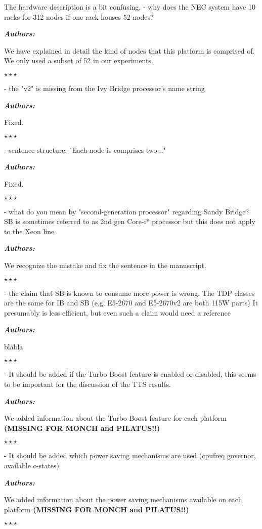 \documentclass[a4paper,11pt]{article}
\newcounter{question}
\newcommand{\weReply}{\vspace{0.25cm} {\bf \noindent } \addtocounter{question}{1} \textbf{\emph{Authors:}} \medskip \em\par}
\newenvironment{weSay}{\bigskip \weReply \begin{it}}{\end{it}\begin{center} \samepage$\star \star \star$ \end{center}}
\begin{document}
The hardware description is a bit confusing.
- why does the NEC system have 10 racks for 312 nodes if one rack houses 52
     nodes?

\begin{weSay}
We have explained in detail the kind of nodes that this platform is comprised of.
We only used a subset of 52 in our experiments.
\end{weSay}

- the "v2" is missing from the Ivy Bridge processor's name string

\begin{weSay}
Fixed.
\end{weSay}

- sentence structure: "Each node is comprises two..."

\begin{weSay}
Fixed.
\end{weSay}

- what do you mean by "second-generation processor" regarding Sandy Bridge?
     SB is sometimes referred to as 2nd gen Core-i* processor but this does not
     apply to the Xeon line

\begin{weSay}
We recognize the mistake and fix the sentence in the manuscript.
\end{weSay}

- the claim that SB is known to consume more power is wrong. The TDP classes
     are the same for IB and SB (e.g. E5-2670 and E5-2670v2 are both 115W parts)
     It presumably is less efficient, but even such a claim would need a reference

\begin{weSay}
blabla
\end{weSay}

- It should be added if the Turbo Boost feature is enabled or disabled, this
     seems to be important for the discussion of the TTS results.

\begin{weSay}
We added information about the Turbo Boost feature for each platform \textbf{(MISSING FOR MONCH and PILATUS!!)}
\end{weSay}

- It should be added which power saving mechanisms are used (cpufreq
     governor, available c-states)

\begin{weSay}
We added information about the power saving mechanisms available on each platform \textbf{(MISSING FOR MONCH and PILATUS!!)}
\end{weSay}
\end{document}
